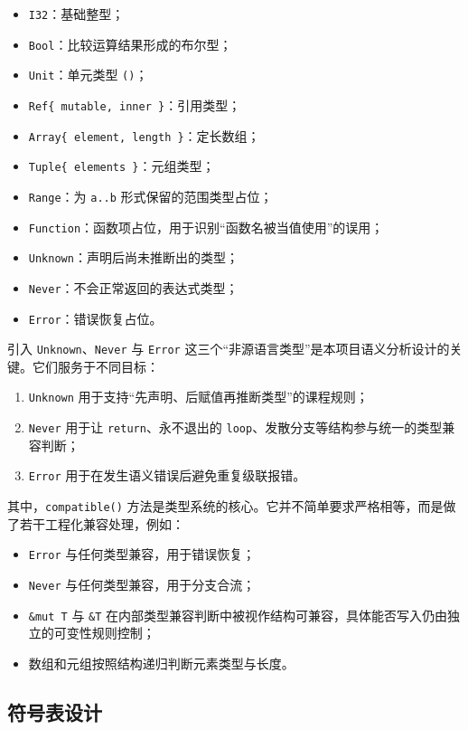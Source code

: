 \documentclass[UTF8,a4paper,12pt]{ctexart}
\newcommand{\pkg}[1]{\texttt{#1}}
\begin{document}
\begin{itemize}
    \item \pkg{I32}：基础整型；
    \item \pkg{Bool}：比较运算结果形成的布尔型；
    \item \pkg{Unit}：单元类型 \pkg{()}；
    \item \pkg{Ref\{ mutable, inner \}}：引用类型；
    \item \pkg{Array\{ element, length \}}：定长数组；
    \item \pkg{Tuple\{ elements \}}：元组类型；
    \item \pkg{Range}：为 \pkg{a..b} 形式保留的范围类型占位；
    \item \pkg{Function}：函数项占位，用于识别“函数名被当值使用”的误用；
    \item \pkg{Unknown}：声明后尚未推断出的类型；
    \item \pkg{Never}：不会正常返回的表达式类型；
    \item \pkg{Error}：错误恢复占位。
\end{itemize}

引入 \pkg{Unknown}、\pkg{Never} 与 \pkg{Error} 这三个“非源语言类型”是本项目语义分析设计的关键。它们服务于不同目标：

\begin{enumerate}[label=\arabic*.]
    \item \pkg{Unknown} 用于支持“先声明、后赋值再推断类型”的课程规则；
    \item \pkg{Never} 用于让 \pkg{return}、永不退出的 \pkg{loop}、发散分支等结构参与统一的类型兼容判断；
    \item \pkg{Error} 用于在发生语义错误后避免重复级联报错。
\end{enumerate}

其中，\pkg{compatible()} 方法是类型系统的核心。它并不简单要求严格相等，而是做了若干工程化兼容处理，例如：

\begin{itemize}
    \item \pkg{Error} 与任何类型兼容，用于错误恢复；
    \item \pkg{Never} 与任何类型兼容，用于分支合流；
    \item \pkg{\&mut T} 与 \pkg{\&T} 在内部类型兼容判断中被视作结构可兼容，具体能否写入仍由独立的可变性规则控制；
    \item 数组和元组按照结构递归判断元素类型与长度。
\end{itemize}

\subsection{符号表设计}
\end{document}
